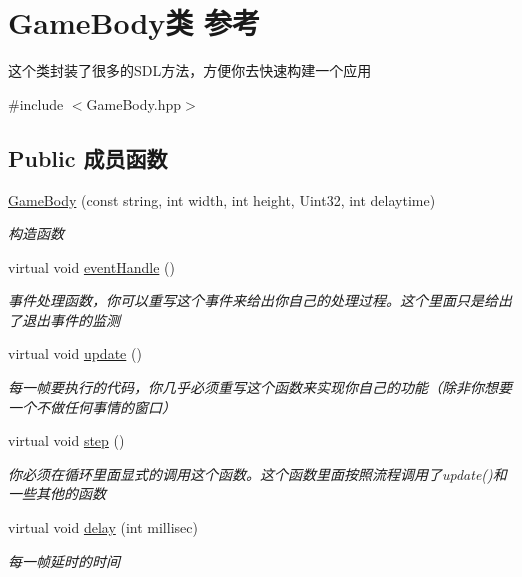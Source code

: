 \hypertarget{class_game_body}{}\section{Game\+Body类 参考}
\label{class_game_body}


这个类封装了很多的\+S\+D\+L方法，方便你去快速构建一个应用  




{\ttfamily \#include $<$Game\+Body.\+hpp$>$}

\subsection*{Public 成员函数}
\begin{DoxyCompactItemize}
\item 
\mbox{\hyperlink{class_game_body_ab0ab54f534157a3bfc545bcbf9136455}{Game\+Body}} (const string, int width, int height, Uint32, int delaytime)
\begin{DoxyCompactList}\small\item\em 构造函数 \end{DoxyCompactList}\item 
virtual void \mbox{\hyperlink{class_game_body_a87994250c16faae42aeb68ff98031589}{event\+Handle}} ()
\begin{DoxyCompactList}\small\item\em 事件处理函数，你可以重写这个事件来给出你自己的处理过程。这个里面只是给出了退出事件的监测 \end{DoxyCompactList}\item 
virtual void \mbox{\hyperlink{class_game_body_abeff43d0ab34cf69977c386736953552}{update}} ()
\begin{DoxyCompactList}\small\item\em 每一帧要执行的代码，你几乎必须重写这个函数来实现你自己的功能（除非你想要一个不做任何事情的窗口） \end{DoxyCompactList}\item 
virtual void \mbox{\hyperlink{class_game_body_a4eca53ae69ac545e3e3666d7929a9cf4}{step}} ()
\begin{DoxyCompactList}\small\item\em 你必须在循环里面显式的调用这个函数。这个函数里面按照流程调用了update()和一些其他的函数 \end{DoxyCompactList}\item 
virtual void \mbox{\hyperlink{class_game_body_a402e91bd648142d2b4925a6923860852}{delay}} (int millisec)
\begin{DoxyCompactList}\small\item\em 每一帧延时的时间 \end{DoxyCompactList}\item 

\end{DoxyCompactItemize}
